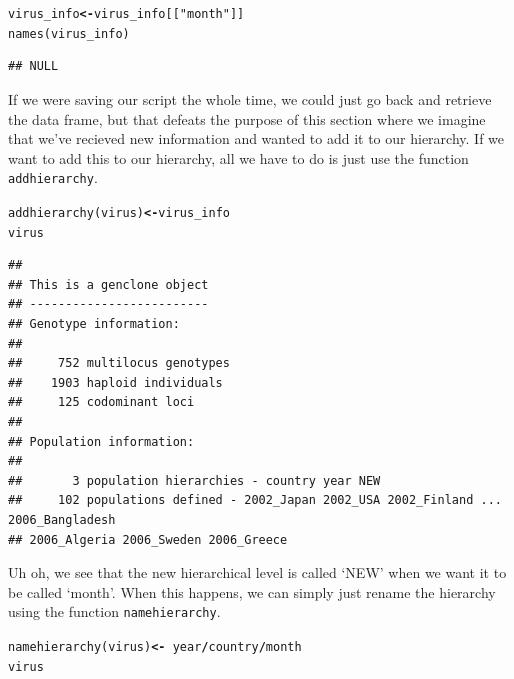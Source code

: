 \documentclass[letterpaper]{article}\usepackage[]{graphicx}\usepackage[]{color}
\makeatletter
\newcommand{\hlstr}[1]{\textcolor[rgb]{0.651,0.522,0}{#1}}%
\newcommand{\hlopt}[1]{\textcolor[rgb]{1,0,0.502}{\textbf{#1}}}%
\newcommand{\hlstd}[1]{\textcolor[rgb]{0,0,0}{#1}}%
\newcommand{\hlkwb}[1]{\textcolor[rgb]{0.502,0.502,0.753}{\textbf{#1}}}%
\newcommand{\hlkwd}[1]{\textcolor[rgb]{0,0.267,0.4}{#1}}%
\newenvironment{kframe}{%
 \def\at@end@of@kframe{}%
 \ifinner\ifhmode%
  \def\at@end@of@kframe{\end{minipage}}%
  \begin{minipage}{\columnwidth}%
 \fi\fi%
 \def\FrameCommand##1{\hskip\@totalleftmargin \hskip-\fboxsep
 \colorbox{shadecolor}{##1}\hskip-\fboxsep
     \hskip-\linewidth \hskip-\@totalleftmargin \hskip\columnwidth}%
 \MakeFramed {\advance\hsize-\width
   \@totalleftmargin\z@ \linewidth\hsize
   \@setminipage}}%
 {\par\unskip\endMakeFramed%
 \at@end@of@kframe}
\newenvironment{knitrout}{}{} %
\makeatother
\begin{document}
\begin{knitrout}\footnotesize
{}\color{fgcolor}\begin{kframe}
\begin{alltt}
\hlstd{virus_info} \hlkwb{<-} \hlstd{virus_info[[}\hlstr{"month"}\hlstd{]]}
\hlkwd{names}\hlstd{(virus_info)}
\end{alltt}
\begin{verbatim}
## NULL
\end{verbatim}
\end{kframe}
\end{knitrout}

\noindent
If we were saving our script the whole time, we could just go back and retrieve
the data frame, but that defeats the purpose of this section where we imagine
that we've recieved new information and wanted to add it to our hierarchy. If we
want to add this to our hierarchy, all we have to do is just use the function
\texttt{addhierarchy}.
\begin{knitrout}\footnotesize
{}\color{fgcolor}\begin{kframe}
\begin{alltt}
\hlkwd{addhierarchy}\hlstd{(virus)} \hlkwb{<-} \hlstd{virus_info}
\hlstd{virus}
\end{alltt}
\end{kframe}
\end{knitrout}

\begin{knitrout}\footnotesize
{}\color{fgcolor}\begin{kframe}
\begin{verbatim}
## 
## This is a genclone object
## -------------------------
## Genotype information:
## 
##     752 multilocus genotypes
##    1903 haploid individuals
##     125 codominant loci
## 
## Population information:
## 
##       3 population hierarchies - country year NEW
##     102 populations defined - 2002_Japan 2002_USA 2002_Finland ... 2006_Bangladesh 
## 2006_Algeria 2006_Sweden 2006_Greece
\end{verbatim}
\end{kframe}
\end{knitrout}


Uh oh, we see that the new hierarchical level is called `NEW' when we want it to
be called `month'. When this happens, we can simply just rename the hierarchy
using the function \texttt{namehierarchy}.
\begin{knitrout}\footnotesize
{}\color{fgcolor}\begin{kframe}
\begin{alltt}
\hlkwd{namehierarchy}\hlstd{(virus)} \hlkwb{<-} \hlopt{~}\hlstd{year}\hlopt{/}\hlstd{country}\hlopt{/}\hlstd{month}
\hlstd{virus}
\end{alltt}
\end{kframe}
\end{knitrout}
\end{document}
